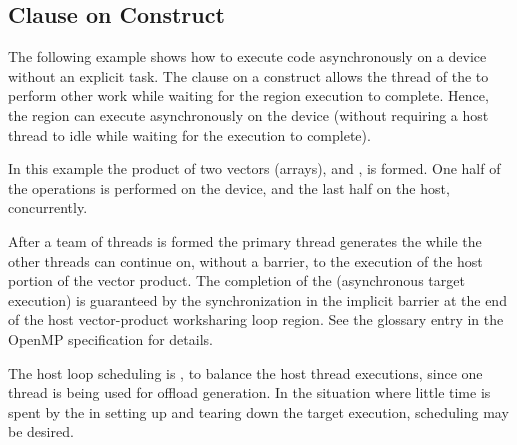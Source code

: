 \subsection{ Clause on  Construct}
\label{subsec:target_nowait_clause}

The following example shows how to execute code asynchronously on a 
device without an explicit task. The  clause on a  
construct allows the thread of the  to perform other
work while waiting for the  region execution to complete. 
Hence, the  region can execute asynchronously on the 
device (without requiring a host thread to idle while waiting for 
the  execution to complete).

In this example the product of two vectors (arrays), 
and , is formed. One half of the operations is performed
on the device, and the last half on the host, concurrently.

After a team of threads is formed the primary thread generates 
the  while the other threads can continue on, without a barrier,
to the execution of the host portion of the vector product.
The completion of the  (asynchronous target execution) is 
guaranteed by the synchronization in the implicit barrier at the end of the 
host vector-product worksharing loop region. See the  
glossary entry in the OpenMP specification for details.

The host loop scheduling is , to balance the host thread executions, since 
one thread is being used for offload generation. In the situation where 
little time is spent by the  in setting 
up and tearing down the target execution,  scheduling may be desired. 



